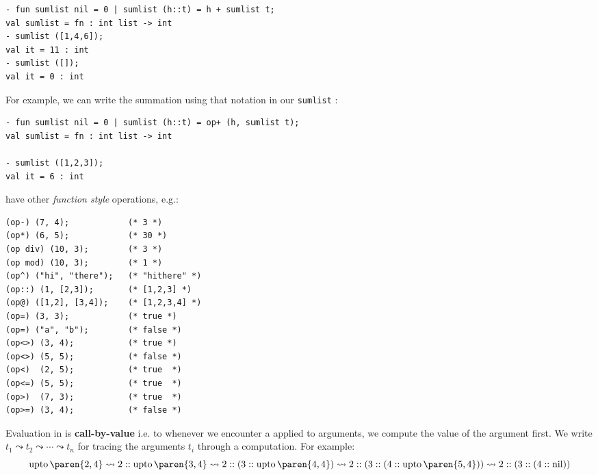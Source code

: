 \begin{verbatim}
- fun sumlist nil = 0 | sumlist (h::t) = h + sumlist t;
val sumlist = fn : int list -> int
- sumlist ([1,4,6]);
val it = 11 : int
- sumlist ([]);
val it = 0 : int
\end{verbatim}

For example, we can write the summation using that notation in our \texttt{sumlist} :
\begin{verbatim}
- fun sumlist nil = 0 | sumlist (h::t) = op+ (h, sumlist t);
val sumlist = fn : int list -> int

- sumlist ([1,2,3]);
val it = 6 : int
\end{verbatim}
 have other \textit{function style} operations, e.g.:
\begin{verbatim}
(op-) (7, 4);            (* 3 *)
(op*) (6, 5);            (* 30 *)
(op div) (10, 3);        (* 3 *)
(op mod) (10, 3);        (* 1 *)
(op^) ("hi", "there");   (* "hithere" *)
(op::) (1, [2,3]);       (* [1,2,3] *)
(op@) ([1,2], [3,4]);    (* [1,2,3,4] *)
(op=) (3, 3);            (* true *)
(op=) ("a", "b");        (* false *)
(op<>) (3, 4);           (* true *)
(op<>) (5, 5);           (* false *)
(op<)  (2, 5);           (* true  *)
(op<=) (5, 5);           (* true  *)
(op>)  (7, 3);           (* true  *)
(op>=) (3, 4);           (* false *)
\end{verbatim}



Evaluation in  is \textbf{call-by-value} i.e. to whenever we encounter a  applied to arguments, we compute the value of the argument first. We write $t_1 \leadsto t_2 \leadsto \cdots \leadsto t_n$ for tracing the  arguments $t_i$ through a  computation. For example:
\[
\operatorname{upto}\paren{2,4} \leadsto 2::\operatorname{upto}\paren{3,4} \leadsto 2::(3::\operatorname{upto}\paren{4,4}) \leadsto 2::(3::(4::\operatorname{upto}\paren{5,4})) \leadsto 2::(3::(4::\operatorname{nil})) 
\]

